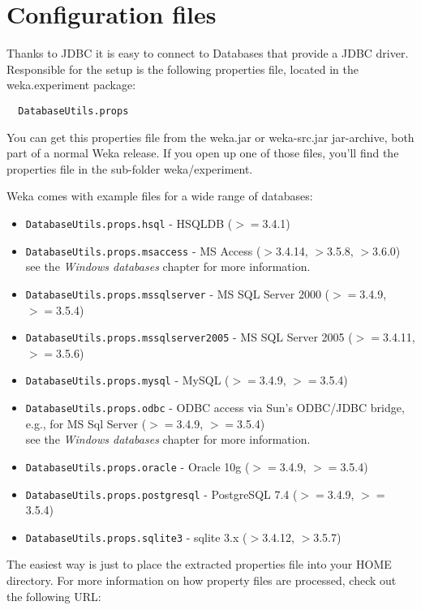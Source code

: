 
\section{Configuration files}
Thanks to JDBC it is easy to connect to Databases that provide a JDBC driver. Responsible for the setup is the following properties file, located in the weka.experiment package:

\begin{verbatim}
  DatabaseUtils.props
\end{verbatim}

\noindent You can get this properties file from the weka.jar or weka-src.jar jar-archive, both part of a normal Weka release. If you open up one of those files, you'll find the properties file in the sub-folder weka/experiment.

Weka comes with example files for a wide range of databases:

\begin{itemize}
	\item \texttt{DatabaseUtils.props.hsql} - HSQLDB ($>=$3.4.1)
	\item \texttt{DatabaseUtils.props.msaccess} - MS Access ($>$3.4.14, $>$3.5.8, $>$3.6.0) \\
	see the \textit{Windows databases} chapter for more information.
	\item \texttt{DatabaseUtils.props.mssqlserver} - MS SQL Server 2000 ($>=$3.4.9, $>=$3.5.4)
	\item \texttt{DatabaseUtils.props.mssqlserver2005} - MS SQL Server 2005 ($>=$3.4.11, $>=$3.5.6)
	\item \texttt{DatabaseUtils.props.mysql} - MySQL ($>=$3.4.9, $>=$3.5.4)
	\item \texttt{DatabaseUtils.props.odbc} - ODBC access via Sun's ODBC/JDBC bridge, e.g., for MS Sql Server ($>=$3.4.9, $>=$3.5.4) \\
	see the \textit{Windows databases} chapter for more information.
	\item \texttt{DatabaseUtils.props.oracle} - Oracle 10g ($>=$3.4.9, $>=$3.5.4)
	\item \texttt{DatabaseUtils.props.postgresql} - PostgreSQL 7.4 ($>=$3.4.9, $>=$3.5.4)
	\item \texttt{DatabaseUtils.props.sqlite3} - sqlite 3.x ($>$3.4.12, $>$3.5.7)
\end{itemize}

The easiest way is just to place the extracted properties file into your HOME directory. For more information on how property files are processed, check out the following URL: \\

